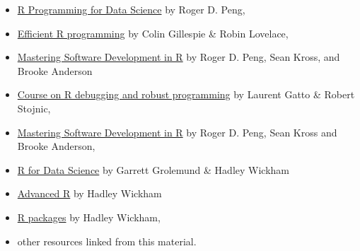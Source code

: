 \documentclass[]{book}
\providecommand{\tightlist}{%
  \setlength{\itemsep}{0pt}\setlength{\parskip}{0pt}}
\begin{document}
\begin{itemize}
\tightlist
\item
  \href{https://bookdown.org/rdpeng/rprogdatascience/}{R Programming for
  Data Science} by Roger D. Peng,
\item
  \href{https://bookdown.org/csgillespie/efficientR/}{Efficient R
  programming} by Colin Gillespie \& Robin Lovelace,
\item
  \href{https://bookdown.org/rdpeng/RProgDA/}{Mastering Software
  Development in R} by Roger D. Peng, Sean Kross, and Brooke Anderson
\item
  \href{https://github.com/lgatto/2016-02-25-adv-programming-EMBL}{Course
  on R debugging and robust programming} by Laurent Gatto \& Robert
  Stojnic,
\item
  \href{https://bookdown.org/rdpeng/RProgDA/}{Mastering Software
  Development in R} by Roger D. Peng, Sean Kross and Brooke Anderson,
\item
  \href{http://r4ds.had.co.nz/index.html}{R for Data Science} by Garrett
  Grolemund \& Hadley Wickham
\item
  \href{http://adv-r.had.co.nz/}{Advanced R} by Hadley Wickham
\item
  \href{http://r-pkgs.had.co.nz/}{R packages} by Hadley Wickham,
\item
  other resources linked from this material.
\end{itemize}


\end{document}
